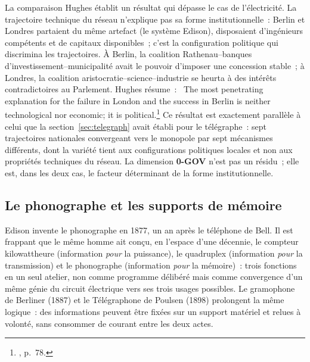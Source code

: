 %
La comparaison Hughes établit un résultat qui dépasse le cas de l'électricité. La trajectoire technique du réseau n'explique pas sa forme institutionnelle~: Berlin et Londres partaient du même artefact (le système Edison), disposaient d'ingénieurs compétents et de capitaux disponibles~; c'est la configuration politique qui discrimina les trajectoires. À Berlin, la coalition Rathenau--banques d'investissement--municipalité avait le pouvoir d'imposer une concession stable~; à Londres, la coalition aristocratie--science--industrie se heurta à des intérêts contradictoires au Parlement. Hughes résume~: \og~The most penetrating explanation for the failure in London and the success in Berlin is neither technological nor economic; it is political.\fg{}\footnote{\textcite{hughes_networks_1983}, p.~78.} Ce résultat est exactement parallèle à celui que la section~\ref{sec:telegraph} avait établi pour le télégraphe~: sept trajectoires nationales convergeant vers le monopole par sept mécanismes différents, dont la variété tient aux configurations politiques locales et non aux propriétés techniques du réseau. La dimension \textbf{0-GOV} n'est pas un résidu~; elle est, dans les deux cas, le facteur déterminant de la forme institutionnelle.





\subsection{Le phonographe et les supports de mémoire}\label{subsec:phonographe}

%
Edison invente le phonographe en 1877, un an après le téléphone de Bell. Il est frappant que le même homme ait conçu, en l'espace d'une décennie, le compteur kilowattheure (information \emph{pour} la puissance), le quadruplex (information \emph{pour} la transmission) et le phonographe (information \emph{pour} la mémoire)~: trois fonctions en un seul atelier, non comme programme délibéré mais comme convergence d'un même génie du circuit électrique vers ses trois usages possibles. Le gramophone de Berliner (1887) et le Télégraphone de Poulsen (1898) prolongent la même logique~: des informations peuvent être fixées sur un support matériel et relues à volonté, sans consommer de courant entre les deux actes.

